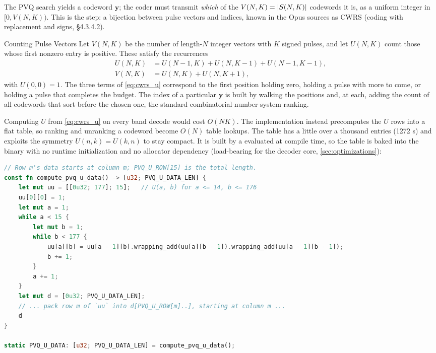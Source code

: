 The PVQ search yields a codeword $\mathbf{y}$; the coder must
transmit \emph{which}
of the $V(N,K) = \lvert S(N,K)\rvert$ codewords it is, as a uniform integer in
$[0, V(N,K))$. This is the  step: a bijection between
pulse vectors and indices, known in the Opus sources as CWRS (coding with
replacement and signs, \S4.3.4.2).

\begin{concept}{Counting Pulse Vectors}
  Let $V(N, K)$ be the number of length-$N$ integer vectors with $K$ signed
  pulses, and let $U(N, K)$ count those whose first nonzero entry is positive.
  These satisfy the recurrences
  \begin{align}
    \label{eq:cwrs_u}
    U(N, K) &= U(N-1, K) + U(N, K-1) + U(N-1, K-1), \\
    \label{eq:cwrs_v}
    V(N, K) &= U(N, K) + U(N, K+1),
  \end{align}
  with $U(0,0) = 1$. The three terms of \cref{eq:cwrs_u} correspond to the first
  position holding zero, holding a pulse with more to come, or holding a pulse
  that completes the budget. The index of a particular $\mathbf{y}$ is built by
  walking the positions and, at each, adding the count of all codewords that
  sort before the chosen one, the standard combinatorial-number-system ranking.
\end{concept}

Computing $U$ from \cref{eq:cwrs_u} on every band decode would cost $O(NK)$. The
implementation instead precomputes the $U$ rows into a flat table, so ranking
and unranking a codeword become $O(N)$ table lookups. The table has a little
over a thousand entries (1272 s) and exploits the symmetry
$U(n,k)=U(k,n)$ to stay compact. It is built by a  evaluated at
compile time, so the table is baked into the binary with no runtime
initialization and no allocator dependency (load-bearing for the
 decoder core, \cref{sec:optimizations}):

\begin{lstlisting}[language=Rust]
// Row m's data starts at column m; PVQ_U_ROW[15] is the total length.
const fn compute_pvq_u_data() -> [u32; PVQ_U_DATA_LEN] {
    let mut uu = [[0u32; 177]; 15];   // U(a, b) for a <= 14, b <= 176
    uu[0][0] = 1;
    let mut a = 1;
    while a < 15 {
        let mut b = 1;
        while b < 177 {
            uu[a][b] = uu[a - 1][b].wrapping_add(uu[a][b - 1]).wrapping_add(uu[a - 1][b - 1]);
            b += 1;
        }
        a += 1;
    }
    let mut d = [0u32; PVQ_U_DATA_LEN];
    // ... pack row m of `uu` into d[PVQ_U_ROW[m]..], starting at column m ...
    d
}

static PVQ_U_DATA: [u32; PVQ_U_DATA_LEN] = compute_pvq_u_data();
\end{lstlisting}

